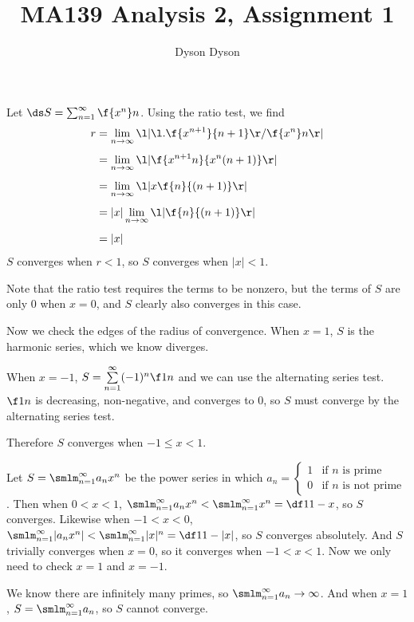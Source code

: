 \documentclass[a4paper]{article}
\title{MA139 Analysis 2, Assignment 1}
\author{Dyson Dyson}
\date{}
\begin{document}
\maketitle

\setlength{\parindent}{0em}
\setlength{\parskip}{1em}


Let $\ds S = \sum_{n=1}^\infty \f{x^n}n$. Using the ratio test, we find \begin{align*}
r &= \lim_{n \to \infty} \l| \l. \f{x^{n+1}}{n+1} \r/ \f{x^n}n \r|\\[1ex]
&= \lim_{n \to \infty} \l| \f{x^{n+1} n}{x^n (n+1)} \r|\\[1ex]
&= \lim_{n \to \infty} \l| x \f{n}{(n+1)} \r|\\[1ex]
&= |x| \lim_{n \to \infty} \l| \f{n}{(n+1)} \r|\\[1ex]
&= |x|
\end{align*}
$S$ converges when $r < 1$, so $S$ converges when $|x| < 1$.

Note that the ratio test requires the terms to be nonzero, but the terms of $S$ are only $0$ when $x=0$, and $S$ clearly also converges in this case.

Now we check the edges of the radius of convergence. When $x=1$, $S$ is the harmonic series, which we know diverges. %

When $x=-1$, $S = \sum\limits_{n=1}^\infty (-1)^n \f1n$ and we can use the alternating series test. $\f1n$ is decreasing, non-negative, and converges to $0$, so $S$ must converge by the alternating series test.

Therefore $S$ converges when $-1 \le x < 1$.


Let $S = \smlm_{n=1}^\infty a_n x^n$ be the power series in which $a_n = \begin{cases}
1 & \text{if } n \text{ is prime}\\
0 & \text{if } n \text{ is not prime}
\end{cases}$. Then when $0 < x < 1$, $\smlm_{n=1}^\infty a_n x^n < \smlm_{n=1}^\infty x^n = \df1{1-x}$, so $S$ converges. Likewise when $-1 < x < 0$, $\smlm_{n=1}^\infty |a_n x^n| < \smlm_{n=1}^\infty |x|^n = \df1{1-|x|}$, so $S$ converges absolutely. And $S$ trivially converges when $x=0$, so it converges when $-1 < x < 1$. Now we only need to check $x=1$ and $x=-1$.

We know there are infinitely many primes, so $\smlm_{n=1}^\infty a_n \to \infty$. And when $x = 1$, $S = \smlm_{n=1}^\infty a_n$, so $S$ cannot converge.
\end{document}
